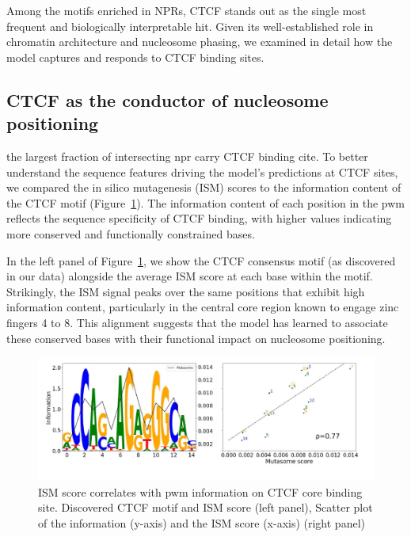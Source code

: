 \documentclass[11pt]{book}
\begin{document}
Among the motifs enriched in NPRs, CTCF stands out as the single most frequent and biologically interpretable hit. Given its well-established role in chromatin architecture and nucleosome phasing, we examined in detail how the model captures and responds to CTCF binding sites.

\subsection{CTCF as the conductor of nucleosome positioning}
the largest fraction of intersecting \gls{npr} carry CTCF binding cite. To better understand the sequence features driving the model’s predictions at CTCF sites, we compared the in silico mutagenesis (ISM) scores to the information content of the CTCF motif (Figure~\ref{fig:ctcf_information}). The information content of each position in the \gls{pwm} reflects the sequence specificity of CTCF binding, with higher values indicating more conserved and functionally constrained bases.

In the left panel of Figure~\ref{fig:ctcf_information}, we show the CTCF consensus motif (as discovered in our data) alongside the average ISM score at each base within the motif. Strikingly, the ISM signal peaks over the same positions that exhibit high information content, particularly in the central core region known to engage zinc fingers 4 to 8. This alignment suggests that the model has learned to associate these conserved bases with their functional impact on nucleosome positioning.

\begin{figure}[htbp]
    \centering
    \includegraphics[width=\textwidth]{Figures/Results/CTCF information.pdf}
    \caption{ISM score correlates with \gls{pwm} information on CTCF core binding site. Discovered CTCF motif and ISM score (left panel), Scatter plot of the information (y-axis) and the ISM score (x-axis) (right panel)}

    \label{fig:ctcf_information}
\end{figure}
\end{document}
